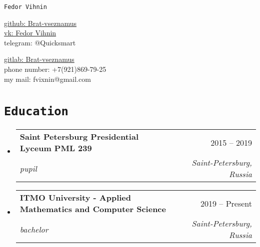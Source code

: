 \documentclass[letterpaper,10pt]{article}
\makeatletter
\newcommand{\apricotColor}[1]{\colorbox{Apricot}{\texttt{#1}}}
\newcommand{\resumeSubheading}[4]{
  \vspace{-2pt}\item
    \begin{tabular*}{0.97\textwidth}[t]{l@{\extracolsep{\fill}}r}
      \textbf{#1} & #2 \\
      \textit{\small#3} & \textit{\small #4} \\
    \end{tabular*}\vspace{-7pt}
}
\newcommand{\resumeSubHeadingListStart}{\begin{itemize}[leftmargin=0.15in, label={}]}
\newcommand{\resumeSubHeadingListEnd}{\end{itemize}}
\makeatother
\begin{document}
\begin{center}
  \colorbox{Peach}{\texttt{{\LARGE Fedor Vihnin}}} \\ \vspace{2pt}
    \begin{multicols}{2}
    \begin{flushleft}
    \href{https://github.com/Brat-vseznamus}{github: Brat-vseznamus}\\
    \href{https://vk.com/looongboooi}{vk: Fedor Vihnin}\\
    telegram: @Quicksmart
    \end{flushleft}
    
    \begin{flushright}
    \href{https://gitlab.com/Brat-vseznamus}{gitlab: Brat-vseznamus}\\
    phone number: +7(921)869-79-25\\
    my mail: fvixnin@gmail.com
    \end{flushright}
    \end{multicols}
\end{center}


\vspace{-2pt}
\section{\apricotColor{Education}}
    \resumeSubHeadingListStart
        \resumeSubheading
        {Saint Petersburg Presidential Lyceum PML 239
        }{2015 -- 2019}
        {pupil}{Saint-Petersburg, Russia}

    \resumeSubHeadingListEnd
  \resumeSubHeadingListStart
      \resumeSubheading
      {ITMO University - Applied Mathematics and Computer Science}{2019 -- Present}
      {bachelor}{Saint-Petersburg, Russia}

  \resumeSubHeadingListEnd


\end{document}
